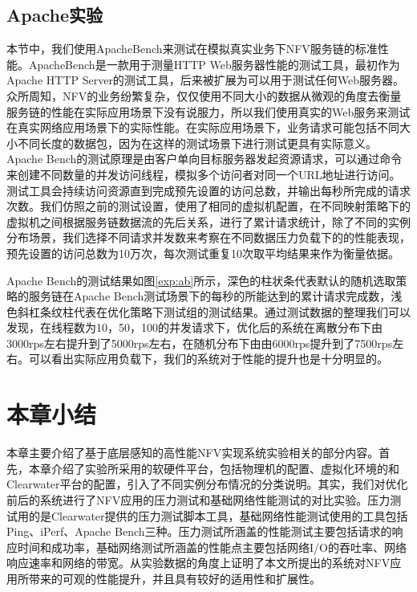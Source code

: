 \subsection{Apache实验}
本节中，我们使用ApacheBench来测试在模拟真实业务下NFV服务链的标准性能。ApacheBench是一款用于测量HTTP Web服务器性能的测试工具，最初作为Apache HTTP Server的测试工具，后来被扩展为可以用于测试任何Web服务器。众所周知，NFV的业务纷繁复杂，仅仅使用不同大小的数据从微观的角度去衡量服务链的性能在实际应用场景下没有说服力，所以我们使用真实的Web服务来测试在真实网络应用场景下的实际性能。在实际应用场景下，业务请求可能包括不同大小不同长度的数据包，因为在这样的测试场景下进行测试更具有实际意义。Apache Bench的测试原理是由客户单向目标服务器发起资源请求，可以通过命令来创建不同数量的并发访问线程，模拟多个访问者对同一个URL地址进行访问。测试工具会持续访问资源直到完成预先设置的访问总数，并输出每秒所完成的请求次数。我们仿照之前的测试设置，使用了相同的虚拟机配置，在不同映射策略下的虚拟机之间根据服务链数据流的先后关系，进行了累计请求统计，除了不同的实例分布场景，我们选择不同请求并发数来考察在不同数据压力负载下的的性能表现，预先设置的访问总数为10万次，每次测试重复10次取平均结果来作为衡量依据。
\begin{figure}[!htp]
	\centering
\end{figure}
\begin{figure}
\addtocounter{subfigure}{2}
\ContinuedFloat
\centering
\end{figure}

Apache Bench的测试结果如图\ref{exp:ab}所示，深色的柱状条代表默认的随机选取策略的服务链在Apache Bench测试场景下的每秒的所能达到的累计请求完成数，浅色斜杠条纹柱代表在优化策略下测试组的测试结果。通过测试数据的整理我们可以发现，在线程数为10，50，100的并发请求下，优化后的系统在离散分布下由3000rps左右提升到了5000rps左右，在随机分布下由由6000rps提升到了7500rps左右。可以看出实际应用负载下，我们的系统对于性能的提升也是十分明显的。

\newpage
\section{本章小结}
本章主要介绍了基于底层感知的高性能NFV实现系统实验相关的部分内容。首先，本章介绍了实验所采用的软硬件平台，包括物理机的配置、虚拟化环境的和Clearwater平台的配置，引入了不同实例分布情况的分类说明。其实，我们对优化前后的系统进行了NFV应用的压力测试和基础网络性能测试的对比实验。压力测试用的是Clearwater提供的压力测试脚本工具，基础网络性能测试使用的工具包括Ping、iPerf、Apache Bench三种。压力测试所涵盖的性能测试主要包括请求的响应时间和成功率，基础网络测试所涵盖的性能点主要包括网络I/O的吞吐率、网络响应速率和网络的带宽。从实验数据的角度上证明了本文所提出的系统对NFV应用所带来的可观的性能提升，并且具有较好的适用性和扩展性。